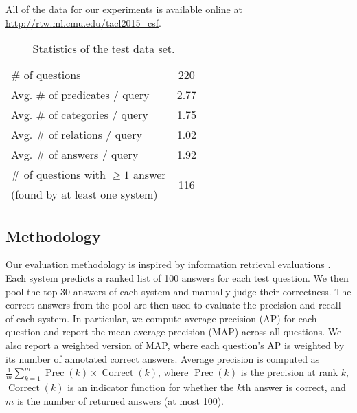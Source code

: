 \documentclass[11pt]{article}
\DeclareMathOperator{\precision}{Prec}
\DeclareMathOperator{\correct}{Correct}
\begin{document}
All of the data for our experiments is available online at {\small
  \url{http://rtw.ml.cmu.edu/tacl2015_csf}}.


\begin{table}
\centering
{\small
\begin{tabular}{lc}  \toprule
\# of questions & 220 \\
\quad{} Avg. \# of predicates / query & 2.77 \\
\quad{} Avg. \# of categories / query & 1.75 \\
\quad{} Avg. \# of relations / query & 1.02 \\  
\quad{} Avg. \# of answers / query & 1.92 \\ \midrule %
\# of questions with $\geq 1$ answer & \multirow{2}{*}{116} \\
(found by at least one system) & \\
\bottomrule
\end{tabular}
}
\vspace{-.1in}
\caption{Statistics of the test data set.}
\label{table:statistics}
\vspace{-.15in}
\end{table}

\subsection{Methodology}

Our evaluation methodology is inspired by information retrieval
evaluations \cite{manning2008}. Each system predicts a ranked list of
100 answers for each test question. We then pool the top 30 answers of
each system and manually judge their correctness. The correct answers
from the pool are then used to evaluate the precision and recall of
each system. In particular, we compute average precision (AP) for each
question and report the mean average precision (MAP) across all
questions. We also report a weighted version of MAP, where each
question's AP is weighted by its number of annotated correct
answers. Average precision is computed as $\frac{1}{m}
\sum_{k=1}^m\precision(k) \times \correct(k)$, where $\precision(k)$
is the precision at rank $k$, $\correct(k)$ is an indicator function
for whether the $k$th answer is correct, and $m$ is the number of
returned answers (at most 100).
\end{document}

